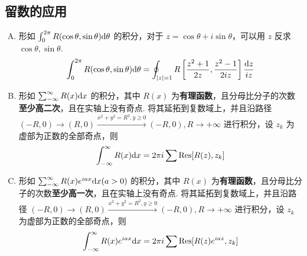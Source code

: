 \documentclass[./main.tex]{subfiles}
\begin{document}
\subsection{留数的应用}
\begin{enumerate}[(A)]
    \item 形如 $\int_0^{2\pi}R(\cos\theta,\sin\theta)\text{d}\theta$ 的积分，对于 $z=\cos\theta+i\sin\theta$，可以用 $z$ 反求 $\cos\theta,\sin\theta$. 
    \begin{equation}
        \int_0^{2\pi}R(\cos\theta,\sin\theta)\text{d}\theta=\oint_{|z|=1}R\left[\frac{z^2+1}{2z},\frac{z^2-1}{2iz}\right]\frac{\text{d}z}{iz}
    \end{equation}
    \item 形如 $\sum_{-\infty}^{\infty}R(x)\text{d}x$ 的积分，其中 $R(x)$ 为\textbf{有理函数}，且分母比分子的次数\textbf{至少高二次}，且在实轴上没有奇点. 将其延拓到复数域上，并且沿路径 $(-R,0)\rightarrow(R,0)\xrightarrow{x^2+y^2=R^2,y\ge 0}(-R,0),R\rightarrow+\infty$ 进行积分，设 $z_k$ 为虚部为正数的全部奇点，则
    \begin{equation}
        \int_{-\infty}^{\infty}R(x)\text{d}x=2\pi i\sum\text{Res}[R(z),z_k]
    \end{equation}
    \item 形如 $\sum_{-\infty}^{\infty}R(x)e^{iax}\text{d}x(a>0)$ 的积分，其中 $R(x)$ 为\textbf{有理函数}，且分母比分子的次数\textbf{至少高一次}，且在实轴上没有奇点. 将其延拓到复数域上，并且沿路径 $(-R,0)\rightarrow(R,0)\xrightarrow{x^2+y^2=R^2,y\ge 0}(-R,0),R\rightarrow+\infty$ 进行积分，设 $z_k$ 为虚部为正数的全部奇点，则
    \begin{equation}
        \int_{-\infty}^{\infty}R(x)e^{iax}\text{d}x=2\pi i\sum\text{Res}[R(z)e^{iaz},z_k]
    \end{equation}
\end{enumerate}
\end{document}
